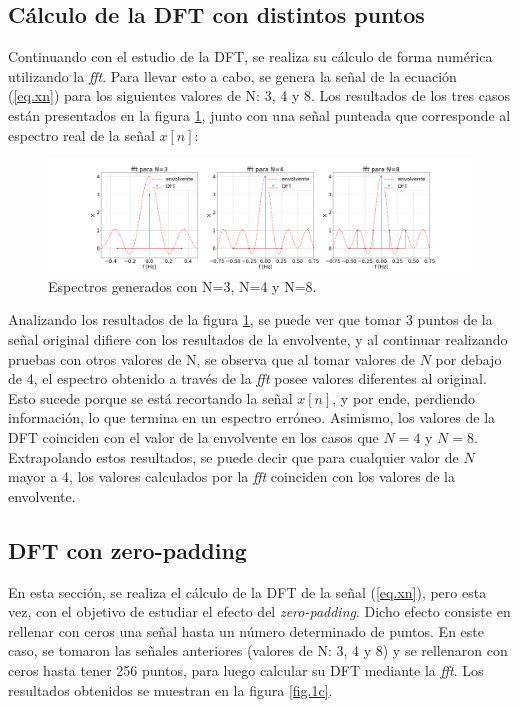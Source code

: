 \documentclass[11pt,a4paper]{article}
\begin{document}
    \subsection{Cálculo de la DFT con distintos puntos}    
    Continuando con el estudio de la DFT, se realiza su cálculo de forma numérica utilizando la \textit{fft}. Para llevar esto a cabo, se genera la señal de la ecuación (\ref{eq.xn}) para los siguientes valores de N: 3, 4 y 8. Los resultados de los tres casos están presentados en la figura \ref{fig.3b}, junto con una señal punteada que corresponde al espectro real de la señal $x[n]$:

    \begin{figure}[htb]
    \centering
    \includegraphics[width=\textwidth]{Img/punto_3_b.png} 
    \caption{Espectros generados con N=3, N=4 y N=8.}
    \label{fig.3b}
    \end{figure}
    
    Analizando los resultados de la figura \ref{fig.3b}, se puede ver que tomar 3 puntos de la señal original difiere con los resultados de la envolvente, y al continuar realizando pruebas con otros valores de N, se observa que al tomar valores de $N$ por debajo de 4, el espectro obtenido a través de la \textit{fft} posee valores diferentes al original. Esto sucede porque se está recortando la señal $x[n]$, y por ende, perdiendo información, lo que termina en un espectro erróneo.
    Asimismo, los valores de la DFT coinciden con el valor de la envolvente en los casos que $N=4$ y $N=8$. Extrapolando estos resultados, se puede decir que para cualquier valor de $N$ mayor a 4, los valores calculados por la \textit{fft} coinciden con los valores de la envolvente.

    \subsection{DFT con zero-padding}
    En esta sección, se realiza el cálculo de la DFT de la señal (\ref{eq.xn}), pero esta vez, con el objetivo de estudiar el efecto del \textit{zero-padding}. Dicho efecto consiste en rellenar con ceros una señal hasta un número determinado de puntos. En este caso, se tomaron las señales anteriores (valores de N: 3, 4 y 8) y se rellenaron con ceros hasta tener 256 puntos, para luego calcular su DFT mediante la \textit{fft}. Los resultados obtenidos se muestran en la figura \ref{fig.1c}.
    
\end{document}

